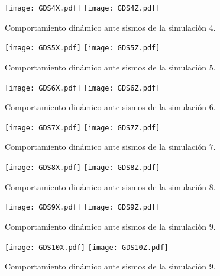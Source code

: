 \begin{figure} [htbp]
\texttt{[image: GDS4X.pdf]}
\texttt{[image: GDS4Z.pdf]}
\caption{Comportamiento din\'amico ante sismos de la simulaci\'on $4$.}
\label{fig:apu70}
\end{figure}


\begin{figure} [htbp]
\texttt{[image: GDS5X.pdf]}
\texttt{[image: GDS5Z.pdf]}
\caption{Comportamiento din\'amico ante sismos de la simulaci\'on $5$.}
\label{fig:apu71}
\end{figure}

\begin{figure} [htbp]
\texttt{[image: GDS6X.pdf]}
\texttt{[image: GDS6Z.pdf]}
\caption{Comportamiento din\'amico ante sismos de la simulaci\'on $6$.}
\label{fig:apu72}
\end{figure}

\begin{figure} [htbp]
\texttt{[image: GDS7X.pdf]}
\texttt{[image: GDS7Z.pdf]}
\caption{Comportamiento din\'amico ante sismos de la simulaci\'on $7$.}
\label{fig:apu73}
\end{figure}

\begin{figure} [htbp]
\texttt{[image: GDS8X.pdf]}
\texttt{[image: GDS8Z.pdf]}
\caption{Comportamiento din\'amico ante sismos de la simulaci\'on $8$.}
\label{fig:apu74}
\end{figure}

\begin{figure} [htbp]
\texttt{[image: GDS9X.pdf]}
\texttt{[image: GDS9Z.pdf]}
\caption{Comportamiento din\'amico ante sismos de la simulaci\'on $9$.}
\label{fig:apu75}
\end{figure}

\begin{figure} [htbp]
\texttt{[image: GDS10X.pdf]}
\texttt{[image: GDS10Z.pdf]}
\caption{Comportamiento din\'amico ante sismos de la simulaci\'on $9$.}
\label{fig:apu76}
\end{figure}


